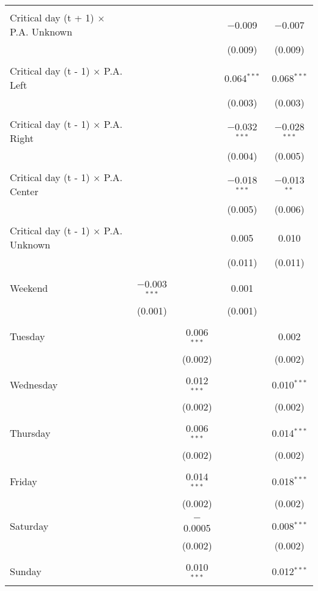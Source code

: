 \documentclass[
]{article}
\begin{document}
\begin{table}[!htbp]
{\begin{tabular}{@{\extracolsep{5pt}}lcccc}
  & & & & \\ 
 Critical day (t + 1) $\times$ P.A. Unknown &  &  & $-$0.009 & $-$0.007 \\ 
  &  &  & (0.009) & (0.009) \\ 
  & & & & \\ 
 Critical day (t - 1) $\times$ P.A. Left &  &  & 0.064$^{***}$ & 0.068$^{***}$ \\ 
  &  &  & (0.003) & (0.003) \\ 
  & & & & \\ 
 Critical day (t - 1) $\times$ P.A. Right &  &  & $-$0.032$^{***}$ & $-$0.028$^{***}$ \\ 
  &  &  & (0.004) & (0.005) \\ 
  & & & & \\ 
 Critical day (t - 1) $\times$ P.A. Center &  &  & $-$0.018$^{***}$ & $-$0.013$^{**}$ \\ 
  &  &  & (0.005) & (0.006) \\ 
  & & & & \\ 
 Critical day (t - 1) $\times$ P.A. Unknown &  &  & 0.005 & 0.010 \\ 
  &  &  & (0.011) & (0.011) \\ 
  & & & & \\ 
 Weekend & $-$0.003$^{***}$ &  & 0.001 &  \\ 
  & (0.001) &  & (0.001) &  \\ 
  & & & & \\ 
 Tuesday &  & 0.006$^{***}$ &  & 0.002 \\ 
  &  & (0.002) &  & (0.002) \\ 
  & & & & \\ 
 Wednesday &  & 0.012$^{***}$ &  & 0.010$^{***}$ \\ 
  &  & (0.002) &  & (0.002) \\ 
  & & & & \\ 
 Thursday &  & 0.006$^{***}$ &  & 0.014$^{***}$ \\ 
  &  & (0.002) &  & (0.002) \\ 
  & & & & \\ 
 Friday &  & 0.014$^{***}$ &  & 0.018$^{***}$ \\ 
  &  & (0.002) &  & (0.002) \\ 
  & & & & \\ 
 Saturday &  & $-$0.0005 &  & 0.008$^{***}$ \\ 
  &  & (0.002) &  & (0.002) \\ 
  & & & & \\ 
 Sunday &  & 0.010$^{***}$ &  & 0.012$^{***}$ \\ 

\end{tabular}}
\end{table}
\end{document}
